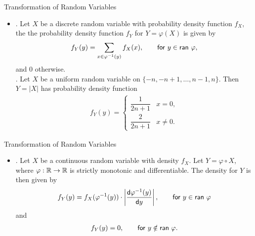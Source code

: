 \begin{frame}{Transformation of Random Variables}

\begin{itemize}
	\justifying
	\item {}. Let $X$ be a discrete random variable with probability density function $f_X$, the the probability density function $f_Y$ for $Y = \varphi(X)$ is given by
	\begin{align*}
	f_Y(y) = \sum_{x\in \varphi^{-1}(y)} f_X(x), \qquad \mathsf{for\ } y\in \mathsf{ran}\ \varphi,
	\end{align*}
	and 0 otherwise.\\
	. Let $X$ be a uniform random variable on $\{-n, -n+1, \ldots, n-1, n\}$. Then $Y = |X|$ has probability density function
	\begin{align*}
	f_Y(y) = \left\{
	\begin{array}{ll}
	\dfrac{1}{2n+1} & x = 0, \\
	\dfrac{2}{2n+1} & x\neq 0.
	\end{array}
	\right.
	\end{align*}
\end{itemize}


\end{frame}


\begin{frame}{Transformation of Random Variables}


\begin{itemize}
\justifying
\item {}. Let $X$ be a continuous random variable with density $f_X$. Let $Y = \varphi\circ X$, where $\varphi: \mathbb{R}\rightarrow \mathbb{R}$ is strictly monotonic and differentiable. The density for $Y$ is then given by
\begin{align*}
f_Y(y) = f_X(\varphi^{-1}(y))\cdot \left|\frac{\mathsf{d}\varphi^{-1}(y)}{\mathsf{d}y} \right|, \qquad \mathsf{for\ } y\in \mathsf{ran\ }\varphi
\end{align*}
and 
\begin{align*}
f_Y(y) = 0, \qquad \mathsf{for\ } y\notin \mathsf{ran\ } \varphi.
\end{align*}
\end{itemize}


\end{frame}


